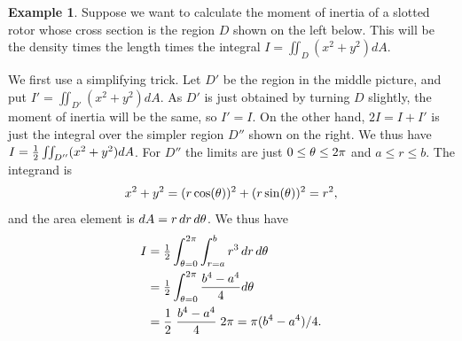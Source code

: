 \documentclass[reqno]{amsart}
\theoremstyle{definition}
\newtheorem{example}[theorem]{Example}
\begin{document}
\begin{example}
 Suppose we want to calculate the moment of inertia of a slotted rotor
 whose cross section is the region $D$ shown on the left below.  This
 will be the density times the length times the integral
 $I=\iint_D(x^2+y^2)dA$.  
 \begin{center}
  \hspace{1em}
  \hspace{1em}
 \end{center}
 We first use a simplifying trick.  Let $D'$ be the region in the
 middle picture, and put $I'=\iint_{D'}(x^2+y^2)dA$.  As $D'$ is just
 obtained by turning $D$ slightly, the moment of inertia will be the
 same, so $I'=I$.  On the other hand, $2I=I+I'$ is just the integral
 over the simpler region $D''$ shown on the right.  We thus have
 $I=\tfrac{1}{2}\iint_{D''}(x^2+y^2)dA$.  For $D''$ the limits are just
 $0\leq\theta\leq 2\pi$ and $a\leq r\leq b$.  The integrand is 
 \[ x^2+y^2 = (r\cos(\theta))^2 + (r\sin(\theta))^2 = r^2, \]
 and the area element is $dA=r\,dr\,d\theta$.  We thus have
 \begin{align*}
  I &= \tfrac{1}{2}\int_{\theta=0}^{2\pi} \int_{r=a}^b r^3\,dr\,d\theta \\
    &= \tfrac{1}{2}\int_{\theta=0}^{2\pi}\frac{b^4-a^4}{4} d\theta \\
    &= \frac{1}{2}\;\frac{b^4-a^4}{4}\;2\pi = 
       \pi(b^4-a^4)/4.
 \end{align*}
\end{example}
\end{document}
